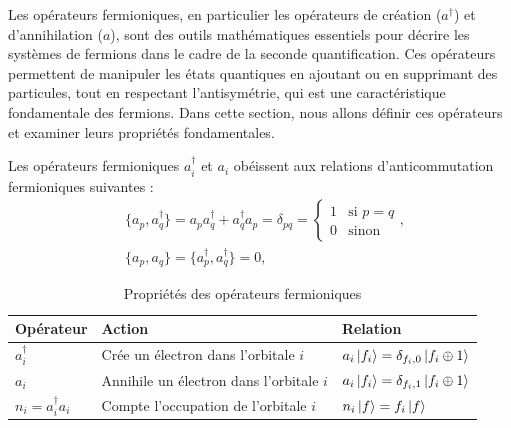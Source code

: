 \documentclass[12pt,a4paper,svgnames,x11names,rgb,table]{article} %
\numberwithin{equation}{section} %
\numberwithin{figure}{section} %
\numberwithin{table}{section} %
\begin{document}
Les opérateurs fermioniques, en particulier les opérateurs de création ($a^\dagger$) et d'annihilation ($a$), sont des outils mathématiques essentiels pour décrire les systèmes de fermions dans le cadre de la seconde quantification. Ces opérateurs permettent de manipuler les états quantiques en ajoutant ou en supprimant des particules, tout en respectant l'antisymétrie, qui est une caractéristique fondamentale des fermions. Dans cette section, nous allons définir ces opérateurs et examiner leurs propriétés fondamentales.

Les opérateurs fermioniques $a^\dagger_i$ et $a_i$ obéissent aux relations d'anticommutation fermioniques suivantes :
\begin{align}\label{eq:anticommutation}
& \{a_p, a^\dagger_q\} = a_p a^\dagger_q + a^\dagger_q a_p = \delta_{pq}
=\begin{cases}
    1  &  \text{si $p = q$} \\
    0  &  \text{sinon}
\end{cases}, \\
& \{a_p, a_q\} = \{a^\dagger_p, a^\dagger_q\} = 0,
\end{align}

\begin{table}[ht]
\centering
\begin{tabular}{|l|l|l|}
\toprule
\textbf{Opérateur} & \textbf{Action} & \textbf{Relation} \\
\midrule
$a^\dagger_i$ & Crée un électron dans l'orbitale $i$ & $a_i\ket{f_i}= \delta_{f_i, 0}\ket{ f_i \oplus 1}$ \\
$a_i$ & Annihile un électron dans l'orbitale $i$ & $a_i\ket{f_i}= \delta_{f_i, 1}\ket{ f_i \oplus 1}$ \\
$n_i = a^\dagger_i a_i$ & Compte l'occupation de l'orbitale $i$ & $n_i \ket{f} = f_i \ket{f}$ \\
\bottomrule
\end{tabular}
\caption{Propriétés des opérateurs fermioniques}
\label{tab:fermion_operators}
\end{table}
\end{document}
